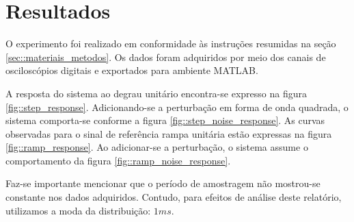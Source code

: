 \section{Resultados}






O experimento foi realizado em conformidade às instruções \cite{CDIN:Roteiro1} resumidas na seção \ref{sec::materiais_metodos}. Os dados foram adquiridos por meio dos canais de osciloscópios digitais e exportados para ambiente MATLAB.

A resposta do sistema ao degrau unitário encontra-se expresso na figura \ref{fig::step_response}. Adicionando-se a perturbação em forma de onda quadrada, o sistema comporta-se conforme a figura \ref{fig::step_noise_response}. As curvas observadas para o sinal de referência rampa unitária estão expressas na figura \ref{fig::ramp_response}. Ao adicionar-se a perturbação, o sistema assume o comportamento da figura \ref{fig::ramp_noise_response}.

Faz-se importante mencionar que o período de amostragem não mostrou-se constante nos dados adquiridos. Contudo, para efeitos de análise deste relatório, utilizamos a moda da distribuição: $1ms$.